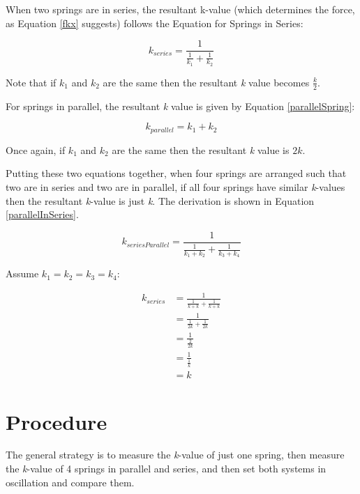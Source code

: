 \documentclass[]{article}
\begin{document}
When two springs are in series, the resultant k-value (which determines the force, as Equation \ref{fkx} suggests) follows the Equation for Springs in Series:

\begin{equation}\label{seriesSpring}
k_{series}=\frac{1}{\frac{1}{k_1} + \frac{1}{k_2}}
\end{equation}

Note that if \textit{$k_1$} and \textit{$ k_2 $} are the same then the resultant \textit{k} value becomes $ \frac{k}{2} $.

For springs in parallel, the resultant \textit{k} value is given by Equation \ref{parallelSpring}:

\begin{equation}\label{parallelSpring}
k_{parallel} = k_1 + k_2
\end{equation}

Once again, if \textit{$k_1$} and \textit{$ k_2 $} are the same then the resultant \textit{k} value is $ 2k $.

Putting these two equations together, when four springs are arranged such that two are in series and two are in parallel, if all four springs have similar \textit{k}-values then the resultant \textit{k}-value is just \textit{k}. The derivation is shown in Equation \ref{parallelInSeries}.

\begin{equation}\label{parallelInSeries}
k_{seriesParallel}=\frac{1}{\frac{1}{k_1+k_2} + \frac{1}{k_3+k_4}}
\end{equation}

Assume $k_1 = k_2 = k_3 = k_4$:

\begin{equation}\label{parallelInSeries2}
\begin{split}
k_{series}&=\frac{1}{\frac{1}{k+k} + \frac{1}{k+k}} \\
&=\frac{1}{\frac{1}{2k} + \frac{1}{2k}} \\
&=\frac{1}{\frac{2}{2k}}\\
&=\frac{1}{\frac{1}{k}}\\
&=k
\end{split}
\end{equation}



\section{Procedure}

The general strategy is to measure the \textit{k}-value of just one spring, then measure the \textit{k}-value of 4 springs in parallel and series, and then set both systems in oscillation and compare them.
\end{document}
